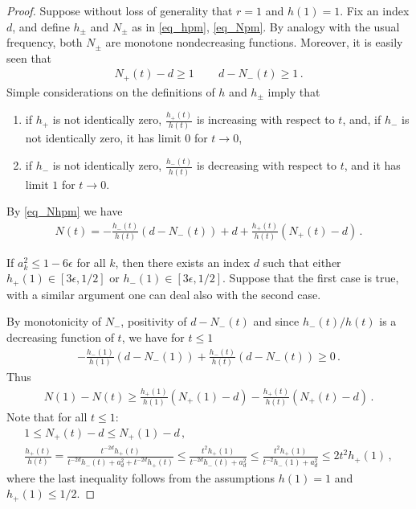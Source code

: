 \documentclass[11pt]{article}
\begin{document}
\begin{proof}
Suppose without loss of generality that $r=1$ and $h(1)=1$. Fix an index $d$, and define $h_\pm$ and $N_\pm$ as in \eqref{eq_hpm}, \eqref{eq_Npm}. By analogy with the usual frequency, both $N_\pm$ are monotone nondecreasing functions. Moreover, it is easily seen that
\begin{gather}
 N_+(t)-d\geq 1 \, \quad \quad d-N_-(t)\geq 1\, .
\end{gather}
Simple considerations on the definitions of $h$ and $h_\pm$ imply that
\begin{enumerate}
 \item if $h_+$ is not identically zero, $\frac{h_+(t)}{h(t)}$ is increasing with respect to $t$, and, if $h_-$ is not identically zero, it has limit $0$ for $t\to 0$,
 \item if $h_-$ is not identically zero, $\frac{h_-(t)}{h(t)}$ is decreasing with respect to $t$, and it has limit $1$ for $t\to 0$.
\end{enumerate}

By \eqref{eq_Nhpm} we have
\begin{gather}
 N(t) = -\frac{h_-(t)}{h(t)} {\left({d-N_-(t)}\right)} + d + \frac{h_+(t)}{h(t)} {\left({N_+(t)-d}\right)}      \, .
\end{gather}

If $a_k^2 \leq 1-6\epsilon$ for all $k$, then there exists an index $d$ such that either $h_+(1)\in [3\epsilon,1/2]$ or $h_-(1) \in [3\epsilon,1/2]$. Suppose that the first case is true, with a similar argument one can deal also with the second case.

By monotonicity of $N_-$, positivity of $d-N_-(t)$ and since $h_-(t)/h(t)$ is a decreasing function of $t$, we have for $t\leq 1$
\begin{gather}
 -\frac{h_-(1)}{h(1)} {\left({d-N_-(1)}\right)} + \frac{h_-(t)}{h(t)} {\left({d-N_-(t)}\right)} \geq 0\, .
\end{gather}
Thus
\begin{gather}
  N(1)-N(t)\geq  \frac{h_+(1)}{h(1)}(N_+(1)-d) -\frac{h_+(t)}{h(t)}(N_+(t)-d) \, .
\end{gather}
Note that for all $t\leq 1$:
\begin{gather}
1\leq N_+(t)-d \leq N_+(1)-d\, ,\\
\frac{h_+(t)}{h(t)} = \frac{t^{-2d}h_+(t)}{t^{-2d}h_-(t) + a_d^2 + t^{-2d}h_+(t)} \leq \frac{t^2 h_+(1)}{t^{-2d}h_-(t) + a_d^2 } \leq \frac{t^2 h_+(1)}{t^{-2}h_-(1) + a_d^2 } \leq 2t^2 h_+(1)\, ,
\end{gather}
where the last inequality follows from the assumptions $h(1)=1$ and $h_+(1)\leq 1/2$.


\end{proof}
\end{document}
